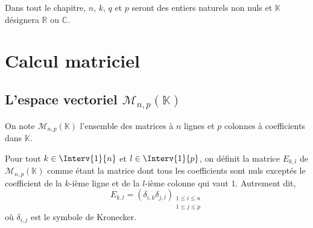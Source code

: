 \documentclass[a4paper,10pt]{report}
\begin{document}



Dans tout le chapitre, $n$, $k$, $q$ et $p$ seront des entiers naturels non nuls et $\mathbb{K}$ désignera $\mathbb{R}$ ou $\mathbb{C}$.

\section{Calcul matriciel}
\subsection{L'espace vectoriel $\mathcal{M}_{n,p}(\mathbb{K})$}

On note $\mathcal{M}_{n,p}(\mathbb{K})$ l'ensemble des matrices à $n$ lignes et $p$ colonnes à coefficients dans $\mathbb{K}$.
%
%
%
%
%
%

\medskip

Pour tout $k\in \Interv{1}{n}$ et $ l \in \Interv{1}{p}$, on définit la matrice $E_{k,l}$ de $\mathcal{M}_{n,p}( \mathbb{K})$ comme étant la matrice dont tous les coefficients sont nuls exceptés le coefficient de la $k$-ième ligne et de la $l$-ième colonne qui vaut $1$. Autrement dit,
$$ E_{k,l} = ( \delta_{i,k} \delta_{j,l})_{\substack{1 \leq i \leq n \\ 1 \leq j \leq p}}$$
où $\delta_{i,j}$ est le symbole de Kronecker.
\end{document}
